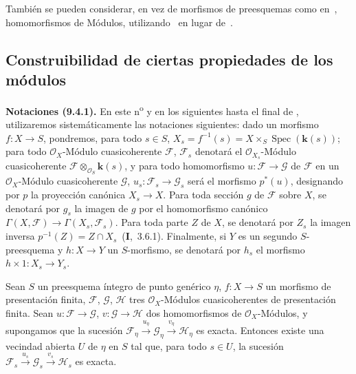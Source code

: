 También se pueden considerar, en vez de morfismos de preesquemas como en~, homomorfismos de Módulos, utilizando~ en lugar de~.


\subsection{Construibilidad de ciertas propiedades de los módulos}
\label{subsection:IV.9.4}

\begin{env}[9.4.1]
\label{IV.9.4.1}
\textbf{Notaciones (9.4.1).}
En este n\textsuperscript{o} y en los siguientes hasta el final de , utilizaremos sistemáticamente las notaciones siguientes: dado un morfismo $f:X\to S$, pondremos, para todo $s\in S$, $X_s=f^{-1}(s)=X\times_S\operatorname{Spec}(\boldsymbol{k}(s))$; para todo $\mathcal O_X$-Módulo cuasicoherente $\mathcal F$, $\mathcal F_s$ denotará el $\mathcal O_{X_s}$-Módulo cuasicoherente $\mathcal F\otimes_{\mathcal O_S}\boldsymbol{k}(s)$, y para todo homomorfismo $u:\mathcal F\to\mathcal G$ de $\mathcal F$ en un $\mathcal O_X$-Módulo cuasicoherente $\mathcal G$, $u_s:\mathcal F_s\to\mathcal G_s$ será el morfismo $p^*(u)$, designando por $p$ la proyección canónica $X_s\to X$.
Para toda sección $g$ de $\mathcal F$ sobre $X$, se denotará por $g_s$ la imagen de $g$ por el homomorfismo canónico $\Gamma(X,\mathcal F)\to\Gamma(X_s,\mathcal F_s)$.
Para toda parte $Z$ de $X$, se denotará por $Z_s$ la imagen inversa $p^{-1}(Z)=Z\cap X_s$~(\textbf{I},~3.6.1).
Finalmente, si $Y$ es un segundo $S$-preesquema y $h:X\to Y$ un $S$-morfismo, se denotará por $h_s$ el morfismo $h\times1:X_s\to Y_s$.
\end{env}

\begin{proposition}[9.4.2]
\label{IV.9.4.2}
Sean $S$ un preesquema íntegro de punto genérico $\eta$, $f:X\to S$ un
morfismo de presentación finita, $\mathcal F$, $\mathcal G$, $\mathcal H$
tres $\mathcal O_X$-Módulos cuasicoherentes de presentación finita. Sean
$u:\mathcal F\to\mathcal G$, $v:\mathcal G\to\mathcal H$ dos
homomorfismos de $\mathcal O_X$-Módulos, y supongamos que la sucesión
$\mathcal F_\eta\xrightarrow{u_\eta}\mathcal G_\eta
\xrightarrow{v_\eta}\mathcal H_\eta$ es exacta. Entonces existe una
vecindad abierta $U$ de $\eta$ en $S$ tal que, para todo $s\in U$, la sucesión
$\mathcal F_s\xrightarrow{u_s}\mathcal G_s
\xrightarrow{v_s}\mathcal H_s$ es exacta.
\end{proposition}

